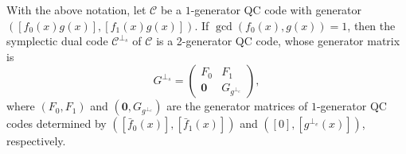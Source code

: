 \documentclass[10pt,a4paper]{amsart}
\begin{document}
\begin{theorem}\label{Dual_Structure} 
	With the above notation,
	let $\mathscr{C}$ be a $1$-generator QC code with generator $(\left[f_0(x)g(x)\right],\left[f_1(x)g(x)\right])$.
	 If $\gcd(f_0(x),g(x))=1$,		
then the symplectic dual code $\mathscr{C}^{\perp_s}$ of $\mathscr{C}$ is a 2-generator QC code, whose generator matrix is
\begin{equation}
	G^{\perp_{s}}=
	\begin{pmatrix}
		F_{0}	& F_{1}\\
		\mathbf{0}&G_{g^{\perp_e}}
	\end{pmatrix},
\end{equation}
where $(F_{0},F_1)$ and $(\mathbf{0},G_{g^{\perp_e}})$ are the generator matrices of $1$-generator QC codes determined by $(\left[ \bar{f}_{0}(x)\right], \left[ \bar{f}_{1}(x)\right])$ and $(\left[ 0\right], \left[ g^{\perp_e}(x)\right])$, respectively. 
\end{theorem}
\end{document}
